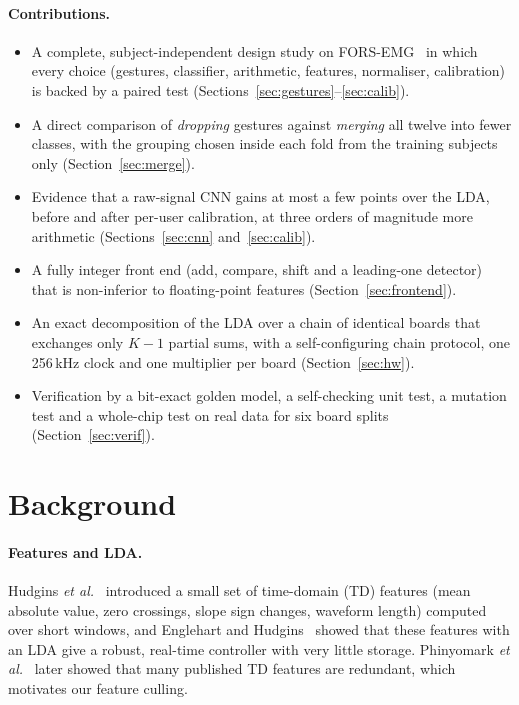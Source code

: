 \documentclass[11pt,a4paper]{article}
\begin{document}
\paragraph{Contributions.}
\begin{itemize}
\item A complete, subject-independent design study on FORS-EMG~\cite{forsemg} in which every choice
(gestures, classifier, arithmetic, features, normaliser, calibration) is backed by a paired test
(Sections~\ref{sec:gestures}--\ref{sec:calib}).
\item A direct comparison of \emph{dropping} gestures against \emph{merging} all twelve into fewer classes,
with the grouping chosen inside each fold from the training subjects only (Section~\ref{sec:merge}).
\item Evidence that a raw-signal CNN gains at most a few points over the LDA, before and after per-user
calibration, at three orders of magnitude more arithmetic (Sections~\ref{sec:cnn} and~\ref{sec:calib}).
\item A fully integer front end (add, compare, shift and a leading-one detector) that is non-inferior to
floating-point features (Section~\ref{sec:frontend}).
\item An exact decomposition of the LDA over a chain of identical boards that exchanges only $K-1$ partial
sums, with a self-configuring chain protocol, one 256\,kHz clock and one multiplier per board
(Section~\ref{sec:hw}).
\item Verification by a bit-exact golden model, a self-checking unit test, a mutation test and a whole-chip
test on real data for six board splits (Section~\ref{sec:verif}).
\end{itemize}

\section{Background}\label{sec:background}
\paragraph{Features and LDA.} Hudgins \emph{et al.}~\cite{hudgins1993} introduced a small set of time-domain
(TD) features (mean absolute value, zero crossings, slope sign changes, waveform length) computed over short
windows, and Englehart and Hudgins~\cite{englehart2003} showed that these features with an LDA give a robust,
real-time controller with very little storage. Phinyomark \emph{et al.}~\cite{phinyomark2012} later showed that
many published TD features are redundant, which motivates our feature culling.
\end{document}
